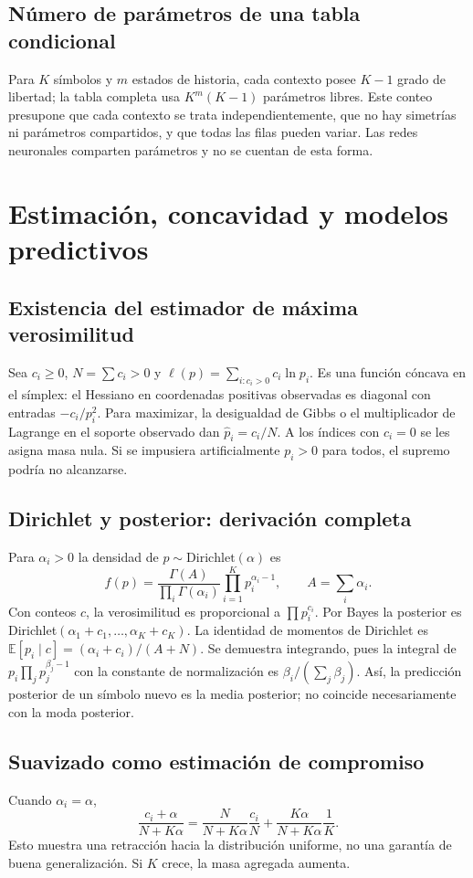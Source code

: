 \documentclass[11pt,a4paper]{report}
\begin{document}
\section{Número de parámetros de una tabla condicional}
Para $K$ símbolos y $m$ estados de historia, cada contexto posee $K-1$
grado de libertad; la tabla completa usa $K^m(K-1)$ parámetros libres.
Este conteo presupone que cada contexto se trata independientemente, que no
hay simetrías ni parámetros compartidos, y que todas las filas pueden variar.
Las redes neuronales comparten parámetros y no se cuentan de esta forma.

\chapter{Estimación, concavidad y modelos predictivos}
\section{Existencia del estimador de máxima verosimilitud}
Sea $c_i\ge0$, $N=\sum c_i>0$ y
$\ell(p)=\sum_{i:c_i>0}c_i\ln p_i$. Es una función cóncava en el
símplex: el Hessiano en coordenadas positivas observadas es diagonal con
entradas $-c_i/p_i^2$. Para maximizar, la desigualdad de Gibbs o el
multiplicador de Lagrange en el soporte observado dan
$\widehat p_i=c_i/N$. A los índices con $c_i=0$ se les asigna masa nula.
Si se impusiera artificialmente $p_i>0$ para todos, el supremo podría no alcanzarse.
\section{Dirichlet y posterior: derivación completa}
Para $\alpha_i>0$ la densidad de $p\sim\mathrm{Dirichlet}(\alpha)$ es
\[
f(p)=\frac{\Gamma(A)}{\prod_i\Gamma(\alpha_i)}
\prod_{i=1}^Kp_i^{\alpha_i-1},\qquad A=\sum_i\alpha_i.
\]
Con conteos $c$, la verosimilitud es proporcional a $\prod p_i^{c_i}$.
Por Bayes la posterior es Dirichlet$(\alpha_1+c_1,\ldots,\alpha_K+c_K)$.
La identidad de momentos de Dirichlet es
$\mathbb E[p_i\mid c]=(\alpha_i+c_i)/(A+N)$.
Se demuestra integrando, pues la integral de $p_i\prod_j p_j^{\beta_j-1}$
con la constante de normalización es $\beta_i/(\sum_j\beta_j)$.
Así, la predicción posterior de un símbolo nuevo es la media posterior;
no coincide necesariamente con la moda posterior.
\section{Suavizado como estimación de compromiso}
Cuando $\alpha_i=\alpha$,
\[
\frac{c_i+\alpha}{N+K\alpha}
=\frac{N}{N+K\alpha}\frac{c_i}{N}+
\frac{K\alpha}{N+K\alpha}\frac1K.
\]
Esto muestra una retracción hacia la distribución uniforme, no una garantía
de buena generalización. Si $K$ crece, la masa agregada aumenta.
\end{document}
